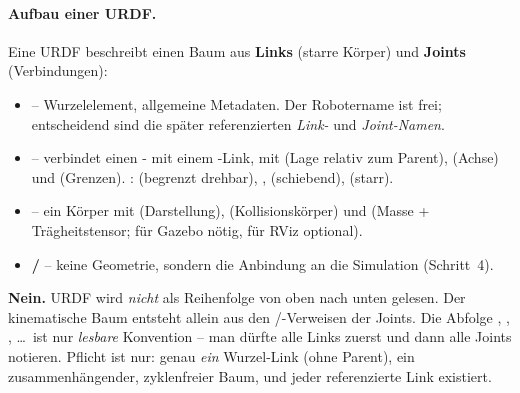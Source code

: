 \paragraph{Aufbau einer URDF.} Eine URDF beschreibt einen Baum aus
\textbf{Links} (starre Körper) und \textbf{Joints} (Verbindungen):
\begin{itemize}
\item \textbf{} -- Wurzelelement, allgemeine Metadaten.
  Der Robotername ist frei; entscheidend sind die später referenzierten
  \emph{Link-} und \emph{Joint-Namen}.
\item \textbf{} -- verbindet einen - mit einem
  -Link, mit  (Lage relativ zum Parent),
   (Achse) und  (Grenzen). :
   (begrenzt drehbar), , 
  (schiebend),  (starr).
\item \textbf{} -- ein Körper mit  (Darstellung),
   (Kollisionskörper) und  (Masse +
  Trägheitstensor; für Gazebo nötig, für RViz optional).
\item \textbf{/} -- keine Geometrie, sondern
  die Anbindung an die Simulation (Schritt~4).
\end{itemize}

\begin{infobox}[title=Müssen Joints und Links in Reihenfolge stehen?]
\textbf{Nein.} URDF wird \emph{nicht} als Reihenfolge von oben nach unten
gelesen. Der kinematische Baum entsteht allein aus den
/-Verweisen der Joints. Die Abfolge ,
, ,  \ldots\ ist nur \emph{lesbare}
Konvention -- man dürfte alle Links zuerst und dann alle Joints notieren. Pflicht
ist nur: genau \emph{ein} Wurzel-Link (ohne Parent), ein zusammenhängender,
zyklenfreier Baum, und jeder referenzierte Link existiert.
\end{infobox}

